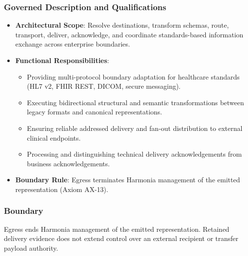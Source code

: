 \subsubsection*{Governed Description and Qualifications}

\begin{itemize}

\item
\textbf{Architectural Scope}: Resolve destinations, transform schemas, route, transport, deliver, acknowledge, and coordinate standards-based information exchange across enterprise boundaries.



\item
\textbf{Functional Responsibilities}:


\begin{itemize}

\item
Providing multi-protocol boundary adaptation for healthcare standards (HL7 v2, FHIR REST, DICOM, secure messaging).



\item
Executing bidirectional structural and semantic transformations between legacy formats and canonical representations.



\item
Ensuring reliable addressed delivery and fan-out distribution to external clinical endpoints.



\item
Processing and distinguishing technical delivery acknowledgements from business acknowledgements.



\end{itemize}


\item
\textbf{Boundary Rule}: Egress terminates Harmonia management of the emitted representation (Axiom AX-13).



\end{itemize}
\subsubsection*{Boundary}

Egress ends Harmonia management of the emitted representation. Retained delivery evidence does not extend control over an external recipient or transfer payload authority.

